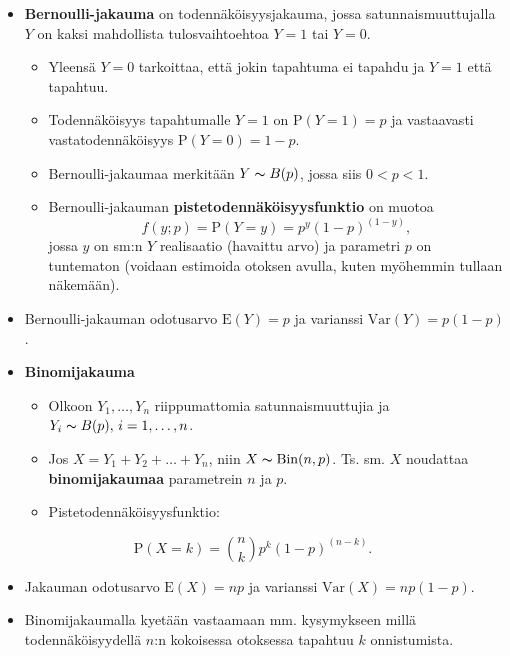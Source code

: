 \documentclass[
]{book}
\providecommand{\tightlist}{%
  \setlength{\itemsep}{0pt}\setlength{\parskip}{0pt}}
\begin{document}
\begin{itemize}
\tightlist
\item
  \textbf{Bernoulli-jakauma} on todennäköisyysjakauma, jossa satunnaismuuttujalla \(Y\) on kaksi mahdollista tulosvaihtoehtoa \(Y=1\) tai \(Y=0\).

  \begin{itemize}
  \tightlist
  \item
    Yleensä \(Y=0\) tarkoittaa, että jokin tapahtuma ei tapahdu ja \(Y=1\) että tapahtuu.
  \item
    Todennäköisyys tapahtumalle \(Y=1\) on \(\text{P}(Y=1)=p\) ja vastaavasti vastatodennäköisyys \(\text{P}(Y=0)=1-p\).
  \item
    Bernoulli-jakaumaa merkitään \(Y \thicksim B(p)\), jossa siis \(0 < p < 1\).
  \item
    Bernoulli-jakauman \textbf{pistetodennäköisyysfunktio} on muotoa
    \[
    f(y; p) = \text{P}(Y=y) = p^y (1-p)^{(1-y)},
    \]
    jossa \(y\) on sm:n \(Y\) realisaatio (havaittu arvo) ja parametri \(p\) on tuntematon (voidaan estimoida otoksen avulla, kuten myöhemmin tullaan näkemään).
  \end{itemize}
\item
  Bernoulli-jakauman odotusarvo \(\text{E}(Y)=p\) ja varianssi \(\mathrm{Var}(Y)=p (1-p)\).
\end{itemize}

\hfill\break

\begin{itemize}
\tightlist
\item
  \textbf{Binomijakauma}

  \begin{itemize}
  \tightlist
  \item
    Olkoon \(Y_1, \ldots, Y_n\) riippumattomia satunnaismuuttujia ja \(Y_i \thicksim B(p), \, i=1,\ldots,n\).
  \item
    Jos \(X = Y_1 + Y_2 + \ldots + Y_n\), niin \(X \thicksim \mathrm{Bin}(n,p)\). Ts. sm. \(X\) noudattaa \textbf{binomijakaumaa} parametrein \(n\) ja \(p\).
  \item
    Pistetodennäköisyysfunktio:
  \end{itemize}
\end{itemize}

\[
\text{P}(X=k) = \binom nk p^k (1-p)^{(n-k)}.
\]

\begin{itemize}
\tightlist
\item
  Jakauman odotusarvo \(\text{E}(X)=np\) ja varianssi \(\mathrm{Var}(X) = n p (1-p)\).
\item
  Binomijakaumalla kyetään vastaamaan mm. kysymykseen millä todennäköisyydellä \(n\):n kokoisessa otoksessa tapahtuu \(k\) onnistumista.
\end{itemize}
\end{document}
